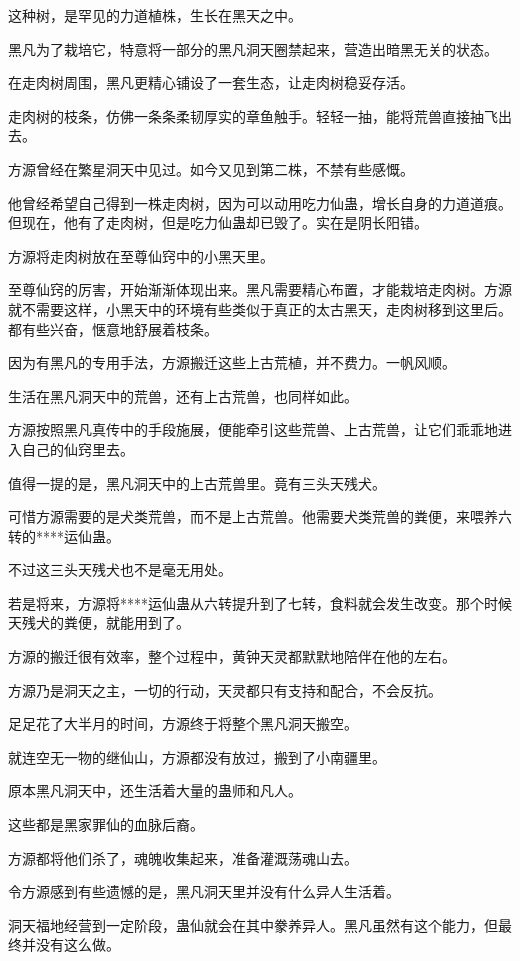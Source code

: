 \begin{this_body}
这种树，是罕见的力道植株，生长在黑天之中。

黑凡为了栽培它，特意将一部分的黑凡洞天圈禁起来，营造出暗黑无关的状态。

在走肉树周围，黑凡更精心铺设了一套生态，让走肉树稳妥存活。

走肉树的枝条，仿佛一条条柔韧厚实的章鱼触手。轻轻一抽，能将荒兽直接抽飞出去。

方源曾经在繁星洞天中见过。如今又见到第二株，不禁有些感慨。

他曾经希望自己得到一株走肉树，因为可以动用吃力仙蛊，增长自身的力道道痕。但现在，他有了走肉树，但是吃力仙蛊却已毁了。实在是阴长阳错。

方源将走肉树放在至尊仙窍中的小黑天里。

至尊仙窍的厉害，开始渐渐体现出来。黑凡需要精心布置，才能栽培走肉树。方源就不需要这样，小黑天中的环境有些类似于真正的太古黑天，走肉树移到这里后。都有些兴奋，惬意地舒展着枝条。

因为有黑凡的专用手法，方源搬迁这些上古荒植，并不费力。一帆风顺。

生活在黑凡洞天中的荒兽，还有上古荒兽，也同样如此。

方源按照黑凡真传中的手段施展，便能牵引这些荒兽、上古荒兽，让它们乖乖地进入自己的仙窍里去。

值得一提的是，黑凡洞天中的上古荒兽里。竟有三头天残犬。

可惜方源需要的是犬类荒兽，而不是上古荒兽。他需要犬类荒兽的粪便，来喂养六转的****运仙蛊。

不过这三头天残犬也不是毫无用处。

若是将来，方源将****运仙蛊从六转提升到了七转，食料就会发生改变。那个时候天残犬的粪便，就能用到了。

方源的搬迁很有效率，整个过程中，黄钟天灵都默默地陪伴在他的左右。

方源乃是洞天之主，一切的行动，天灵都只有支持和配合，不会反抗。

足足花了大半月的时间，方源终于将整个黑凡洞天搬空。

就连空无一物的继仙山，方源都没有放过，搬到了小南疆里。

原本黑凡洞天中，还生活着大量的蛊师和凡人。

这些都是黑家罪仙的血脉后裔。

方源都将他们杀了，魂魄收集起来，准备灌溉荡魂山去。

令方源感到有些遗憾的是，黑凡洞天里并没有什么异人生活着。

洞天福地经营到一定阶段，蛊仙就会在其中豢养异人。黑凡虽然有这个能力，但最终并没有这么做。


\end{this_body}
